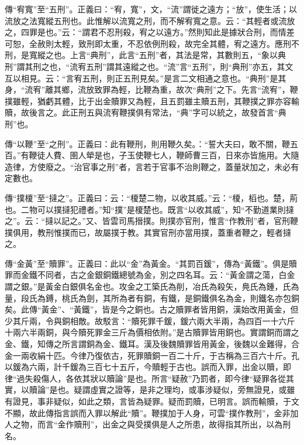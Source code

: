 {\noindent\zhuan{}\fzbyks 傳“宥寬”至“五刑”。正義曰：“宥，寬”，文，“流”謂徙之遠方；“放”，使生活；以流放之法寬縱五刑也。此惟解以流寬之刑，而不解宥寬之意。云：“其輕者或流放之，四罪是也。”云：“謂君不忍刑殺，宥之以遠方。”然則知此是據狀合刑，而情差可恕，全赦則太輕，致刑即太重，不忍依例刑殺，故完全其體，宥之遠方。應刑不刑，是寬縱之也。上言“典刑”，此言“五刑”者，其法是常，其數則五，“象以典刑”謂其刑之也，“流宥五刑”謂其遠縱之也。“流”言“五刑”，則“典刑”亦五，其文互以相見。云：“言宥五刑，則正五刑見矣。”是言二文相通之意也。“典刑”是其身，“流宥”離其鄉，流放致罪為輕，比鞭為重，故次“典刑”之下。先言“流宥”，鞭撲雖輕，猶虧其體，比于出金贖罪又為輕，且五罰雖主贖五刑，其鞭撲之罪亦容輸贖，故後言之。此正刑五與流宥鞭撲俱有常法，“典”字可以統之，故發首言“典刑”也。 \par}

{\noindent\zhuan{}\fzbyks 傳“以鞭”至“之刑”。正義曰：此有鞭刑，則用鞭久矣。：“誓大夫曰，敢不關，鞭五百。”有鞭徒人費、圉人犖是也，子玉使鞭七人，鞭師曹三百，日來亦皆施用。大隨造律，方使廢之。“治官事之刑”者，言若于官事不治則鞭之，蓋量狀加之，未必有定數也。 \par}

{\noindent\zhuan{}\fzbyks 傳“撲榎”至“撻之”。正義曰：云：“榎楚二物，以收其威。”云：“榎，槄也。楚，荊也。二物可以撲撻犯禮者。”知“撲”是榎楚也。既言“以收其威”，知“不勤道業則撻之”。云：“撻以記之。”又、皆雲司馬搢撲。則撲亦官刑，惟言“作教刑”者，官刑鞭撲俱用，教刑惟撲而已，故屬撲于教。其實官刑亦當用撲，蓋重者鞭之，輕者撻之。 \par}

{\noindent\zhuan{}\fzbyks 傳“金黃”至“贖罪”。正義曰：此以“金”為黃金。“其罰百鍰”，傳為“黃鐵”。俱是贖罪而金鐵不同者，古之金銀銅鐵總號為金，別之四名耳。云：“黃金謂之蕩，白金謂之銀。”是黃金白銀俱名金也。攻金之工築氏為削，冶氏為殺矢，鳧氏為鍾，氏為量，段氏為鎛，桃氏為劍，其所為者有銅，有鐵，是銅鐵俱名為金，則鐵名亦包銅矣。此傳“黃金”、“黃鐵”，皆是今之銅也。古之贖罪者皆用銅，漢始改用黃金，但少其斤兩，令與銅相敵。故駁言：“贖死罪千鍰，鍰六兩大半兩，為四百一十六斤十兩六半兩銅，與今贖死罪金三斤為價相依附。”是古贖罪皆用銅也。實謂銅而謂之金、鐵，知傳之所言謂銅為金、鐵耳。漢及後魏贖罪皆用黃金，後魏以金難得，合金一兩收絹十匹。今律乃復依古，死罪贖銅一百二十斤，于古稱為三百六十斤。孔以鍰為六兩，計千鍰為三百七十五斤，今贖輕于古也。誤而入罪，出金以贖，即律“過失殺傷人，各依其狀以贖論”是也。所言“疑赦”乃罰者，即今律“疑罪各從其實，以贖論”是也。疑謂虛實之證等，是非之理均，或事涉疑似，旁無證見，或雖有證見，事非疑似，如此之類，言皆為疑罪。疑而罰贖，已明言。誤而輸贖，于文不顯，故此傳指言誤而入罪以解此“贖”。鞭撲加于人身，可雲“撲作教刑”，金非加人之物，而言“金作贖刑”，出金之與受撲俱是人之所患，故得指其所出，以為刑名。 \par}

